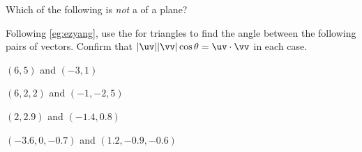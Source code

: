 \begin{activity}
Which of the following is \emph{not} a  of a plane?
\end{activity}










\sectionExercises


\begin{exercise} \label{ex:ezyang} 
Following \cref{eg:ezyang}, use the  for triangles to find the angle between the following pairs of vectors.  
Confirm that \(|\uv||\vv|\cos\theta=\uv\cdot\vv\) in each case.
\begin{Parts}
\item \((6,5)\) and \((-3,1)\)
\item \((6,2,2)\) and \((-1,-2,5)\)
\item \((2,2.9)\) and \((-1.4,0.8)\)
\item \((-3.6,0,-0.7)\) and \((1.2,-0.9,-0.6)\)
\end{Parts}
\end{exercise}




